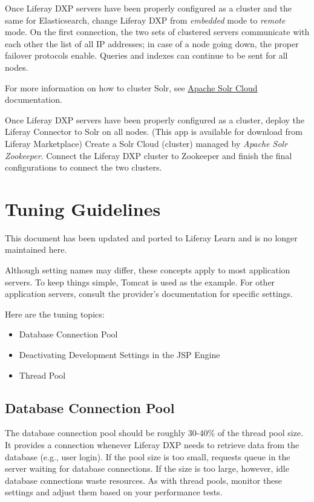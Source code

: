 Once Liferay DXP servers have been properly configured as a cluster and
the same for Elasticsearch, change Liferay DXP from \emph{embedded} mode
to \emph{remote} mode. On the first connection, the two sets of
clustered servers communicate with each other the list of all IP
addresses; in case of a node going down, the proper failover protocols
enable. Queries and indexes can continue to be sent for all nodes.

For more information on how to cluster Solr, see
\href{https://cwiki.apache.org/confluence/display/solr/SolrCloud}{Apache
Solr Cloud} documentation.

Once Liferay DXP servers have been properly configured as a cluster,
deploy the Liferay Connector to Solr on all nodes. (This app is
available for download from Liferay Marketplace) Create a Solr Cloud
(cluster) managed by \emph{Apache Solr Zookeeper}. Connect the Liferay
DXP cluster to Zookeeper and finish the final configurations to connect
the two clusters.

\chapter{Tuning Guidelines}\label{tuning-guidelines}

{This document has been updated and ported to Liferay Learn and is no
longer maintained here.}

Although setting names may differ, these concepts apply to most
application servers. To keep things simple, Tomcat is used as the
example. For other application servers, consult the provider's
documentation for specific settings.

Here are the tuning topics:

\begin{itemize}
\tightlist
\item
  Database Connection Pool
\item
  Deactivating Development Settings in the JSP Engine
\item
  Thread Pool
\end{itemize}

\section{Database Connection Pool}\label{database-connection-pool}

The database connection pool should be roughly 30-40\% of the thread
pool size. It provides a connection whenever Liferay DXP needs to
retrieve data from the database (e.g., user login). If the pool size is
too small, requests queue in the server waiting for database
connections. If the size is too large, however, idle database
connections waste resources. As with thread pools, monitor these
settings and adjust them based on your performance tests.

